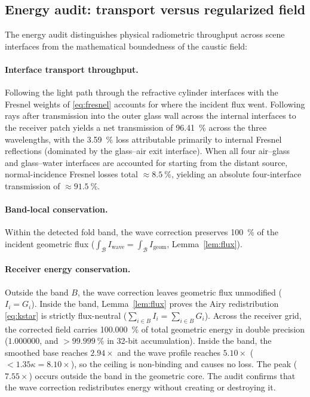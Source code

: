 \subsection{Energy audit: transport versus regularized field}
\label{sec:verify-energy}

The energy audit distinguishes physical radiometric throughput across scene
interfaces from the mathematical boundedness of the caustic field:

\paragraph{Interface transport throughput.} Following the light path through
the refractive cylinder interfaces with the Fresnel weights of \eqref{eq:fresnel}
accounts for where the incident flux went. Following rays after transmission
into the outer glass wall across the internal interfaces to the receiver patch yields
a net transmission of \SI{96.41}{\percent} across the three wavelengths, with the
\SI{3.59}{\percent} loss attributable primarily to internal Fresnel reflections
(dominated by the glass--air exit interface).
When all four air--glass and glass--water interfaces are accounted for starting from
the distant source, normal-incidence Fresnel losses total $\approx \SI{8.5}{\percent}$,
yielding an absolute four-interface transmission of $\approx \SI{91.5}{\percent}$.

\paragraph{Band-local conservation.} Within the detected fold band, the wave
correction preserves \SI{100}{\percent} of the incident geometric flux
($\int_{\mathcal{B}} I_{\text{wave}} = \int_{\mathcal{B}} I_{\text{geom}}$,
Lemma~\ref{lem:flux}).

\paragraph{Receiver energy conservation.} Outside the band $B$, the wave
correction leaves geometric flux unmodified ($I_i = G_i$).
Inside the band, Lemma~\ref{lem:flux} proves the Airy redistribution \eqref{eq:kstar} is strictly flux-neutral ($\sum_{i \in B} I_i = \sum_{i \in B} G_i$).
Across the receiver grid, the corrected field carries \SI{100.000}{\percent} of total geometric energy in double precision ($\num{1.000000}$, and $> \SI{99.999}{\percent}$ in 32-bit accumulation).
Inside the band, the smoothed base reaches $2.94\times$ and the wave profile reaches $5.10\times$ ($< 1.35\kappa = 8.10\times$), so the ceiling is non-binding and causes no loss. The peak ($7.55\times$) occurs outside the band in the geometric core.
The audit confirms that the wave correction redistributes energy without creating
or destroying it.

